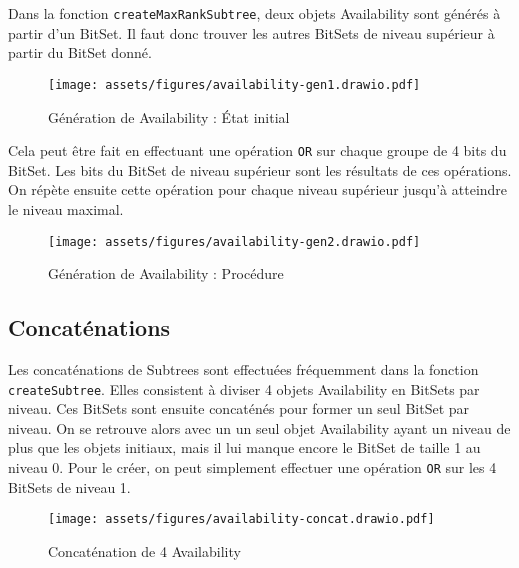 Dans la fonction \texttt{createMaxRankSubtree}, deux objets Availability sont générés à partir d'un BitSet. Il faut donc trouver les autres BitSets de niveau supérieur à partir du BitSet donné.

\begin{figure}[H]
    \centering
    \texttt{[image: assets/figures/availability-gen1.drawio.pdf]}
    \caption{Génération de Availability : État initial}
    \label{fig:availability-gen1}
\end{figure}

Cela peut être fait en effectuant une opération \texttt{OR} sur chaque groupe de 4 bits du BitSet. Les bits du BitSet de niveau supérieur sont les résultats de ces opérations. On répète ensuite cette opération pour chaque niveau supérieur jusqu'à atteindre le niveau maximal.

\begin{figure}[H]
    \centering
    \texttt{[image: assets/figures/availability-gen2.drawio.pdf]}
    \caption{Génération de Availability : Procédure}
    \label{fig:availability-gen2}
\end{figure}

\newpage
\subsection{Concaténations}

Les concaténations de Subtrees sont effectuées fréquemment dans la fonction \texttt{createSubtree}. Elles consistent à diviser 4 objets Availability en BitSets par niveau. Ces BitSets sont ensuite concaténés pour former un seul BitSet par niveau. On se retrouve alors avec un un seul objet Availability ayant un niveau de plus que les objets initiaux, mais il lui manque encore le BitSet de taille 1 au niveau 0. Pour le créer, on peut simplement effectuer une opération \texttt{OR} sur les 4 BitSets de niveau 1.

\begin{figure}[H]
    \centering
    \texttt{[image: assets/figures/availability-concat.drawio.pdf]}
    \caption{Concaténation de 4 Availability}
    \label{fig:availability-concat}
\end{figure}
